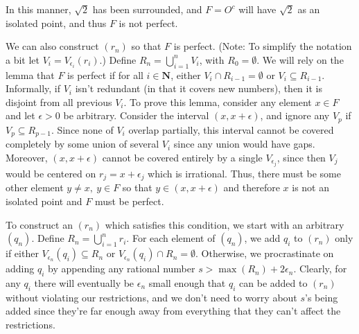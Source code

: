 \begin{solution}
{  In this manner, \(\sqrt{2}\) has been surrounded, and \(F= O^c\) will have \(\sqrt{2}\) as an isolated point, and thus \(F\) is not perfect.

We can also construct \((r_n)\) so that \(F\) is perfect. (Note: To simplify the notation a bit let \(V_i = V_{\epsilon_i}(r_i)\).) Define \(R_n = \bigcup^n_{i=1} V_i\), with \(R_0 = \emptyset\). We will rely on the lemma that \(F\) is perfect if for all \(i \in \mathbf{N}\), either \(V_i \cap R_{i-1} = \emptyset\) or \(V_i \subseteq R_{i-1}\). Informally, if \(V_i\) isn't redundant (in that it covers new numbers), then it is disjoint from all previous \(V_i\). To prove this lemma, consider any element \(x \in F\) and let \(\epsilon >0\) be arbitrary. Consider the interval \((x, x + \epsilon)\), and ignore any \(V_p\) if \(V_p \subseteq R_{p-1}\). Since none of \(V_i\) overlap partially, this interval cannot be covered completely by some union of several \(V_i\) since any union would have gaps. Moreover, \((x, x + \epsilon)\) cannot be covered entirely by a single \(V_{\epsilon_j}\), since then \(V_j\) would be centered on \(r_j = x + \epsilon_j\) which is irrational. Thus, there must be some other element \(y \neq x,\ y\in F\) so that \(y \in (x, x + \epsilon)\) and therefore \(x\) is not an isolated point and \(F\) must be perfect.

To construct an \((r_n)\) which satisfies this condition, we start with an arbitrary \((q_n)\). Define \(R_n = \bigcup^n_{i=1} r_i\). For each element of \((q_n)\), we add \(q_i\) to \((r_n)\) only if either \(V_{\epsilon_n}(q_i) \subseteq R_n\) or \(V_{\epsilon_n}(q_i) \cap R_n = \emptyset\). Otherwise, we procrastinate on adding \(q_i\) by appending any rational number \(s > \max(R_n) + 2 \epsilon_n\). Clearly, for any \(q_i\) there will eventually be \(\epsilon_n\) small enough that \(q_i\) can be added to \((r_n)\) without violating our restrictions, and we don't need to worry about \(s\)'s being added since they're far enough away from everything that they can't affect the restrictions.

  }

\end{solution}

